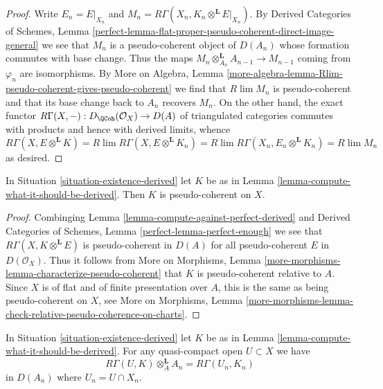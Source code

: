 \begin{proof}
Write $E_n = E|_{X_n}$ and
$M_n = R\Gamma(X_n, K_n \otimes^\mathbf{L} E|_{X_n})$.
By Derived Categories of Schemes, Lemma
\ref{perfect-lemma-flat-proper-pseudo-coherent-direct-image-general}
we see that $M_n$ is a pseudo-coherent object of $D(A_n)$
whose formation commutes with base change. Thus the maps
$M_n \otimes_{A_n}^\mathbf{L} A_{n - 1} \to M_{n - 1}$
coming from $\varphi_n$ are isomorphisms. By
More on Algebra, Lemma
\ref{more-algebra-lemma-Rlim-pseudo-coherent-gives-pseudo-coherent}
we find that $R\lim M_n$ is pseudo-coherent and
that its base change back to $A_n$ recovers $M_n$.
On the other hand, the exact functor
$R\Gamma(X, -) : D_\QCoh(\mathcal{O}_X) \to D(A)$
of triangulated categories commutes with products
and hence with derived limits, whence
$$
R\Gamma(X, E \otimes^\mathbf{L} K) =
R\lim R\Gamma(X,  E \otimes^\mathbf{L} K_n) =
R\lim R\Gamma(X_n, E_n \otimes^\mathbf{L} K_n) =
R\lim M_n
$$
as desired.
\end{proof}

\begin{lemma}
\label{lemma-relative-pseudo-coherence-derived}
In Situation \ref{situation-existence-derived} let $K$ be as in
Lemma \ref{lemma-compute-what-it-should-be-derived}. Then $K$
is pseudo-coherent on $X$.
\end{lemma}

\begin{proof}
Combinging Lemma \ref{lemma-compute-against-perfect-derived} and
Derived Categories of Schemes, Lemma
\ref{perfect-lemma-perfect-enough}
we see that $R\Gamma(X, K \otimes^\mathbf{L} E)$
is pseudo-coherent in $D(A)$ for all pseudo-coherent
$E$ in $D(\mathcal{O}_X)$. Thus it follows from
More on Morphisms, Lemma
\ref{more-morphisms-lemma-characterize-pseudo-coherent}
that $K$ is pseudo-coherent relative to $A$.
Since $X$ is of flat and of finite presentation
over $A$, this is the same as being pseudo-coherent on $X$, see
More on Morphisms, Lemma
\ref{more-morphisms-lemma-check-relative-pseudo-coherence-on-charts}.
\end{proof}

\begin{lemma}
\label{lemma-compute-over-affine-derived}
In Situation \ref{situation-existence-derived} let $K$ be as in
Lemma \ref{lemma-compute-what-it-should-be-derived}. For any quasi-compact
open $U \subset X$ we have
$$
R\Gamma(U, K) \otimes_A^\mathbf{L} A_n =
R\Gamma(U_n, K_n)
$$
in $D(A_n)$ where $U_n = U \cap X_n$.
\end{lemma}

